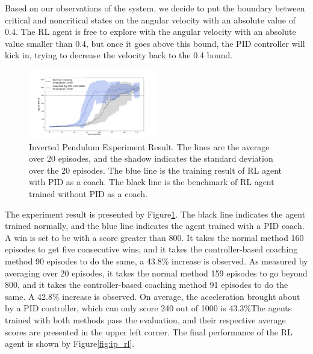 \documentclass[journal]{IEEEtran}
\begin{document}
Based on our observations of the system, we decide to put the boundary between critical and noncritical states on the angular velocity with an absolute value of 0.4. The RL agent is free to explore with the angular velocity with an absolute value smaller than 0.4, but once it goes above this bound, the PID controller will kick in, trying to decrease the velocity back to the 0.4 bound.
\begin{figure}[H]
     \centering
      \includegraphics[width=0.5\textwidth]{ip.png}
      \caption{Inverted Pendulum Experiment Result. The lines are the average over 20 episodes, and the shadow indicates the standard deviation over the 20 episodes. The blue line is the training result of RL agent with PID as a coach. The black line is the benchmark of RL agent trained without PID as a coach. }
      \label{fig:ip_result}

\end{figure}

The experiment result is presented by Figure\ref{fig:ip_result}. The black line indicates the agent trained normally, and the blue line indicates the agent trained with a PID coach. A win is set to be with a score greater than 800. It takes the normal method 160 episodes to get five consecutive wins, and it takes the controller-based coaching method 90 episodes to do the same, a 43.8\% increase is observed. As measured by averaging over 20 episodes, it takes the normal method 159 episodes to go beyond 800, and it takes the controller-based coaching method 91 episodes to do the same. A 42.8\% increase is observed. On average, the acceleration brought about by a PID controller, which can only score 240 out of 1000 is 43.3\%\. The agents trained with both methods pass the evaluation, and their respective average scores are presented in the upper left corner. The final performance of the RL agent is shown by Figure\ref{fig:ip_rl}.
\end{document}
